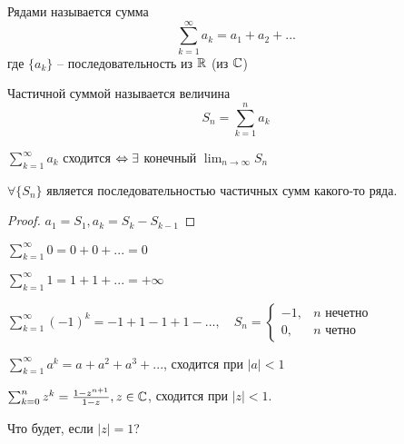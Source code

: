 
\begin{Def}
	Рядами называется сумма
	\[\sum_{k=1}^{\infty} a_k = a_1 + a_2 + ...\]
	где $\{a_k\}$ -- последовательность из $\mathbb{R}$ (из $\mathbb{C}$)   
\end{Def}

\begin{Def}
	Частичной суммой называется величина
	\[S_n = \sum_{k=1}^{n} a_k\]
\end{Def}

\begin{Def}
	$\sum_{k=1}^{\infty} a_k$ сходится $\Leftrightarrow \exists $ конечный $\lim_{n \to \infty} S_n$    
\end{Def}

\begin{Prop}
	$\forall \{S_n\}$ является последовательностью частичных сумм какого-то ряда. 
\end{Prop}

\begin{proof}
	$a_1 = S_1, a_k = S_k - S_{k - 1}$
\end{proof}

\begin{Example}
	$\sum_{k = 1}^\infty 0 = 0 + 0 + ... = 0$ 
\end{Example}

\begin{Example}
	$\sum_{k=1}^{\infty} 1 = 1 + 1 + ... = +\infty$ 
\end{Example}

\begin{Example}
	$\sum_{k=1}^{\infty} (-1)^k = -1 + 1 - 1 + 1 - ..., \quad S_n = \begin{cases}
		-1, &n \text{ нечетно} \\
		0, &n \text{ четно}
	\end{cases}$ 
\end{Example}

\begin{Example}
	$\sum_{k=1}^{\infty} a^k = a + a^2 + a^3 + ...$, сходится при $|a| < 1$
\end{Example}

\begin{Example}
	$\sum_{k=0}^{n} z^k = \frac{1 - z^{n + 1}}{1 - z}, z \in \mathbb{C}$, сходится при $|z| < 1$. 
\end{Example}

\begin{Ex}
	Что будет, если $|z| = 1$?
\end{Ex}

